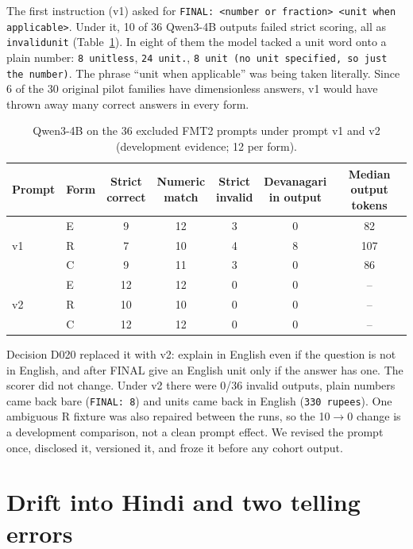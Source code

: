 \documentclass[12pt,a4paper,oneside]{report}
\renewcommand{\_}{\oldunderscore\allowbreak}
\begin{document}
The first instruction (v1) asked for \texttt{FINAL: <number or fraction> <unit when applicable>}. Under it, 10 of 36 Qwen3-4B outputs failed strict scoring, all as \texttt{invalid\_unit} (Table~\ref{tab:fmt2}). In eight of them the model tacked a unit word onto a plain number: \texttt{8 unitless}, \texttt{24 unit.}, \texttt{8 unit (no unit specified, so just the number)}. The phrase ``unit when applicable'' was being taken literally. Since 6 of the 30 original pilot families have dimensionless answers, v1 would have thrown away many correct answers in every form.

\begin{table}[t]
\centering\small
\caption{Qwen3-4B on the 36 excluded FMT2 prompts under prompt v1 and v2 (development evidence; 12 per form).}
\label{tab:fmt2}
\begin{tabular}{@{}llccccc@{}}
\toprule
Prompt & Form & \makecell{Strict\\correct} & \makecell{Numeric\\match} & \makecell{Strict\\invalid} & \makecell{Devanagari\\in output} & \makecell{Median\\output tokens}\\
\midrule
\multirow{3}{*}{v1} & E & 9 & 12 & 3 & 0 & 82\\
 & R & 7 & 10 & 4 & 8 & 107\\
 & C & 9 & 11 & 3 & 0 & 86\\
\midrule
\multirow{3}{*}{v2} & E & 12 & 12 & 0 & 0 & --\\
 & R & 10 & 10 & 0 & 0 & --\\
 & C & 12 & 12 & 0 & 0 & --\\
\bottomrule
\end{tabular}
\end{table}

Decision D020 replaced it with v2: explain in English even if the question is not in English, and after FINAL give an English unit only if the answer has one. The scorer did not change. Under v2 there were 0/36 invalid outputs, plain numbers came back bare (\texttt{FINAL: 8}) and units came back in English (\texttt{330 rupees}). One ambiguous R fixture was also repaired between the runs, so the 10$\to$0 change is a development comparison, not a clean prompt effect. We revised the prompt once, disclosed it, versioned it, and froze it before any cohort output.

\section{Drift into Hindi and two telling errors}
\end{document}
